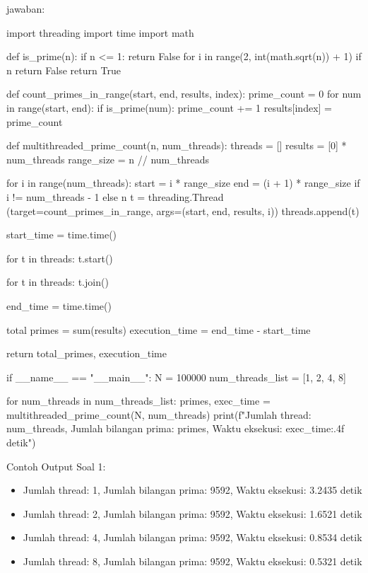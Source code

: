 \documentclass[12pt]{article}
\begin{document}
jawaban:
\begin{python}
    import threading
    import time
    import math

    def is_prime(n):
        if n <= 1:
            return  False
        for i in range(2, int(math.sqrt(n)) + 1)
            if n %
                return False
        return True

        def count_primes_in_range(start, end, results, index):
            prime_count = 0
        for num in range(start, end):
            if is_prime(num):
                prime_count += 1
        results[index] = prime_count

        def multithreaded_prime_count(n, num_threads):
            threads = []
            results = [0] * num_threads
            range_size = n // num_threads

            for i in range(num_threads):
                start = i * range_size
                end = (i + 1) * range_size 
                if i != num_threads - 1 else n
                t = threading.Thread
                (target=count_primes_in_range, 
                args=(start, end, results, i))
                threads.append(t)

            start_time = time.time()

            for t in threads:
                t.start()

            for t in threads:
                t.join()

            end_time = time.time()

            total primes = sum(results)
            execution_time = end_time - start_time

            return total_primes, execution_time

    if __name__ == "__main__":
        N = 100000
        num_threads_list = [1, 2, 4, 8]

        for num_threads in num_threads_list:
        primes, exec_time = multithreaded_prime_count(N, num_threads)
        print(f"Jumlah thread: {num_threads}, Jumlah bilangan prima: {primes}, 
        Waktu eksekusi: {exec_time:.4f} detik")
    \end{python}

Contoh Output Soal 1:
\begin{itemize}
    \item Jumlah thread: 1, Jumlah bilangan prima: 9592, Waktu eksekusi: 3.2435 detik
    \item Jumlah thread: 2, Jumlah bilangan prima: 9592, Waktu eksekusi: 1.6521 detik
    \item Jumlah thread: 4, Jumlah bilangan prima: 9592, Waktu eksekusi: 0.8534 detik
    \item Jumlah thread: 8, Jumlah bilangan prima: 9592, Waktu eksekusi: 0.5321 detik
\end{itemize}
\end{document}
